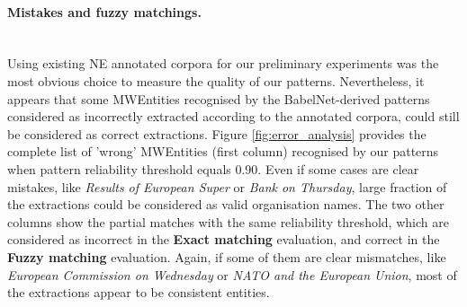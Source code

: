 \documentclass[output=paper]{langsci/langscibook}
\begin{document}
\begin{table}
\centering
{}
\caption{Results obtained with pattern reliability threshold = 0.60}
\label{tab:EvalPatterns}
\end{table}


\paragraph*{Mistakes and fuzzy matchings.}~\\
Using existing NE annotated corpora for our preliminary experiments was the most obvious choice to measure the quality of our patterns. Nevertheless, it appears that some MWEntities recognised by the BabelNet-derived patterns considered as incorrectly extracted according to the annotated corpora, could still be considered as correct extractions.
Figure \ref{fig:error_analysis} provides the complete list of 'wrong' MWEntities (first column) recognised by our patterns when pattern reliability threshold equals 0.90. Even if some cases are clear mistakes, like \textit{Results of European Super} or \textit{Bank on Thursday}, large fraction of the extractions could be considered as valid organisation names. The two other columns show the partial matches with the same reliability threshold, which are considered as incorrect in the \textbf{Exact matching} evaluation, and correct in the \textbf{Fuzzy matching} evaluation. Again, if some of them are clear mismatches, like \textit{European Commission on Wednesday} or \textit{NATO and the European Union}, most of the extractions appear to be consistent entities.
\end{document}
